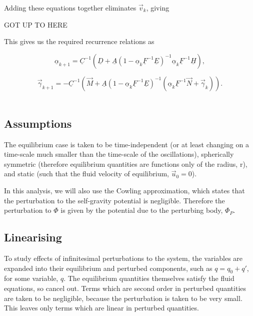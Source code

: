 \documentclass[11pt]{amsart}
\begin{document}
Adding these equations together eliminates $\vec{v}_{k}$, giving

GOT UP TO HERE


This gives us the required recurrence relations as

\begin{equation} \label{eq:IIIalpha}
\underline{\alpha}_{k+1}  =  \underline{C}^{-1} \left(  \underline{D}  + \underline{A} \left( 1 - \underline{\alpha}_{k} \underline{F}^{-1} \underline{E}  \right)^{-1} \underline{\alpha}_{k} \underline{F}^{-1} \underline{H}    \right) ,
\end{equation} 

\begin{equation} \label{eq:IIIgamma}
\vec{\gamma}_{k+1}  =  -   \underline{C}^{-1} \left(  \vec{M}  +  \underline{A} \left( 1 - \underline{\alpha}_{k} \underline{F}^{-1} \underline{E}  \right)^{-1} \left(  \underline{\alpha}_{k} \underline{F}^{-1} \vec{N}  +  \vec{\gamma}_{k}   \right)  \right) .
\end{equation} 
\\













\subsection{Assumptions}

The equilibrium case is taken to be time-independent (or at least changing on a time-scale much 
smaller than the time-scale of the oscillations), spherically symmetric (therefore equilibrium 
quantities are functions only of the radius, r), and static (such that the fluid velocity of 
equilibrium, $\vec{u}_{0} = 0$).

In this analysis, we will also use the Cowling approximation, which states that the perturbation
to the self-gravity potential is negligible.  Therefore the perturbation to $\Phi$ is given by 
the potential due to the perturbing body, $\Phi_{P}$.



\subsection{Linearising}

To study effects of infinitesimal perturbations to the system, the variables are expanded into
their equilibrium and perturbed components, such as $q = q_{0} + q'$, for some variable, $q$.
The equilibrium quantities themselves satisfy the fluid equations, so cancel out.  Terms which are
second order in perturbed quantities are taken to be negligible, because the perturbation is
taken to be very small. This leaves only terms which are linear in perturbed quantities.
\end{document}
